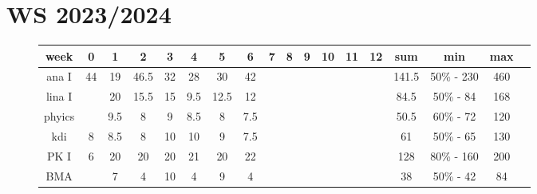 \documentclass{gadsescript}
\begin{document}
\maketitle
\section{WS 2023/2024}
\begin{figure}[H]
	\begin{tabular}{|c|c|c|c|c|c|c|c|c|c|c|c|c|c|c|c|c|c|}
		\hline
		week	& 0	& 1	& 2	& 3	& 4	& 5	& 6	& 7	& 8	& 9	& 10	& 11	& 12	& sum	& min		& max	\\\hline
		ana I	& 44	& 19	& 46.5	& 32	& 28	& 30	& 42	& 	& 	& 	& 	& 	& 	& 141.5	& 50\% - 230	& 460	\\
		lina I	&  	& 20	& 15.5	& 15	& 9.5	& 12.5	& 12	& 	& 	& 	& 	& 	& 	& 84.5	& 50\% - 84	& 168	\\
		phyics	&	& 9.5	& 8	& 9	& 8.5	& 8	& 7.5 	& 	& 	& 	& 	& 	& 	& 50.5	& 60\% - 72	& 120	\\
		kdi	& 8	& 8.5	& 8	& 10	& 10	& 9	& 7.5	& 	& 	& 	& 	& 	& 	& 61	& 50\% - 65	& 130	\\
		PK I	& 6	& 20	& 20	& 20	& 21	& 20	& 22	& 	& 	& 	& 	& 	& 	& 128	& 80\% - 160	& 200	\\
		BMA	& 	& 7	& 4	& 10	& 4	& 9	& 4	& 	& 	& 	& 	& 	& 	& 38	& 50\% - 42	& 84	\\
		\hline
	\end{tabular}
\end{figure}
\end{document}
